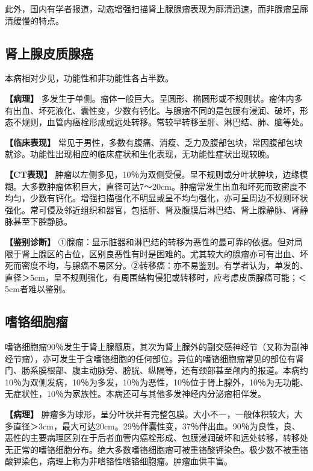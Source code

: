 此外，国内有学者报道，动态增强扫描肾上腺腺瘤表现为廓清迅速，而非腺瘤呈廓清缓慢的特点。

\subsection{肾上腺皮质腺癌}

本病相对少见，功能性和非功能性各占半数。

\textbf{【病理】}
多发生于单侧。瘤体一般巨大。呈圆形、椭圆形或不规则状。瘤体内多有出血、坏死液化、囊性变，少数有钙化。与腺瘤不同的是包膜有浸润、破坏，形态不规则，血管内癌栓形成或远处转移。常较早转移至肝、淋巴结、肺、脑等处。

\textbf{【临床表现】}
常见于男性，多数有腹痛、消瘦、乏力及腹部包块，常因腹部包块就诊。功能性出现相应的临床症状和生化表现，无功能性症状出现较晚。

\textbf{【CT表现】}
肿瘤以左侧多见，10％为双侧受侵。呈不规则或分叶状肿块，边缘模糊。大多数肿瘤体积巨大，直径可达7～20cm。肿瘤常发生出血和坏死而致密度不均匀，少数有钙化。增强扫描强化不明显或呈不均匀强化，亦可呈周边不规则环状强化。常可侵及邻近组织和器官，包括肝、肾及腹膜后淋巴结、肾上腺静脉、肾静脉甚至下腔静脉。

\textbf{【鉴别诊断】}
①腺瘤：显示脏器和淋巴结的转移为恶性的最可靠的依据。但对局限于肾上腺区的占位，区别良恶性有时是困难的。尤其较大的腺瘤亦可有出血、坏死而密度不均，与腺癌不易区分。②转移癌：亦不易鉴别。有学者认为，单发的、直径＞5cm，呈不规则强化，有周围结构侵犯或转移时，应考虑皮质腺癌可能；＜5cm者难以鉴别。

\subsection{嗜铬细胞瘤}

嗜铬细胞瘤90％发生于肾上腺髓质，其次为肾上腺外的副交感神经节（又称为副神经节瘤），亦可发生于含嗜铬细胞的任何部位。异位的嗜铬细胞瘤常见的部位有肾门、肠系膜根部、腹主动脉旁、膀胱、纵隔等，还有颈部甚至颅内的报道。本病约10％为双侧发病，10％为多发，10％为恶性，10％位于肾上腺外，10％为无功能、无症状性，10％为家族性。本病还可与其他多发神经内分泌瘤相伴发。

\textbf{【病理】}
肿瘤多为球形，呈分叶状并有完整包膜。大小不一，一般体积较大，大多直径＞3cm，最大可达20cm。29％伴囊性变，37％伴出血。90％为良性，良、恶性的主要病理区别在于后者血管内癌栓形成、包膜浸润破坏和远处转移，转移处无正常的嗜铬细胞分布。绝大多数嗜铬细胞瘤可被重铬酸钾染色。极少数不被重铬酸钾染色，病理上称为非嗜铬性嗜铬细胞瘤。肿瘤血供丰富。

